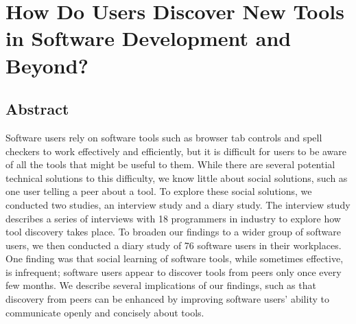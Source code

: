 \section{How Do Users Discover New Tools in Software Development and Beyond?}

\subsection{Abstract}

Software users rely on software tools such as browser tab controls and spell checkers to work effectively and efficiently, but it is difficult for users to be aware of all the tools that might be useful to them. While there are several potential technical solutions to this difficulty, we know little about social solutions, such as one user telling a peer about a tool. To explore these social solutions, we conducted two studies, an interview study and a diary study. The interview study describes a series of interviews with 18 programmers in industry to explore how tool discovery takes place. To broaden our findings to a wider group of software users, we then conducted a diary study of 76 software users in their workplaces. One finding was that social learning of software tools, while sometimes effective, is infrequent; software users appear to discover tools from peers only once every few months. We describe several implications of our findings, such as that discovery from peers can be enhanced by improving software users’ ability to communicate openly and concisely about tools.
